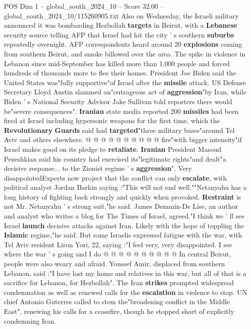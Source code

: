 \begin{textsample}{POS Dim 1 – global\_south\_2024\_10 – Score 32.00 – global\_south\_2024\_10/115260905.txt}
Also on Wednesday, the Israeli military announced it was bombarding Hezbollah \textbf{targets} in Beirut, with a \textbf{Lebanese} security source telling AFP that Israel had hit the city ' s southern \textbf{suburbs} repeatedly overnight.
AFP correspondents heard around 20 \textbf{explosions} coming from southern Beirut, and smoke billowed over the area.
The spike in violence in Lebanon since mid-September has killed more than 1,000 people and forced hundreds of thousands more to flee their homes.
President Joe Biden said the United States was"fully supportive"of Israel after the \textbf{missile} attack.
US Defense Secretary Lloyd Austin slammed an"outrageous act of \textbf{aggression}"by Iran, while Biden ' s National Security Advisor Jake Sullivan told reporters there would be"severe consequences". \textbf{Iranian} state media reported 200 \textbf{missiles} had been fired at Israel including hypersonic weapons for the first time, which the \textbf{Revolutionary} \textbf{Guards} said had \textbf{targeted}"three military bases"around Tel Aviv and others elsewhere. @ @ @ @ @ @ @ @ @ @ fire"with bigger intensity"if Israel makes good on its pledge to \textbf{retaliate}. \textbf{Iranian} President Masoud Pezeshkian said his country had exercised its"legitimate rights"and dealt"a decisive response... to the Zionist regime ' s \textbf{aggression}".
Very disappointedExperts now project that the conflict can only \textbf{escalate}, with political analyst Jordan Barkin saying :"This will not end well.""Netanyahu has a long history of fighting back strongly and quickly when provoked. \textbf{Restraint} is not Mr.
Netanyahu ' s strong suit,"he said.
James Demmin-De Lise, an author and analyst who writes a blog for The Times of Israel, agreed."I think we ' ll see Israel \textbf{launch} decisive attacks against Iran.
Likely with the hope of toppling the \textbf{Islamic} regime,"he said.
But some Israelis expressed fatigue with the war, with Tel Aviv resident Liron Yori, 22, saying :"I feel very, very disappointed.
I see where the war ' s going and I do @ @ @ @ @ @ @ @ @ @ In central Beirut, people were also weary and afraid.
Youssef Amir, displaced from southern Lebanon, said :"I have lost my home and relatives in this war, but all of that is a sacrifice for Lebanon, for Hezbollah".
The Iran \textbf{strikes} prompted widespread condemnation as well as renewed calls for the \textbf{escalation} in violence to stop.
UN chief Antonio Guterres called to stem the"broadening conflict in the Middle East", renewing his calls for a ceasefire, though he stopped short of explicitly condemning Iran.

\end{textsample}
